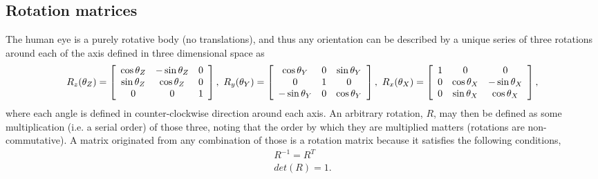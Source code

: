 \subsection{Rotation matrices}
\label{rotmatsss}
The human eye is a purely rotative body (no translations), and thus any orientation can be described by a unique series of three rotations around each of the axis defined in three dimensional space as
\begin{equation}
\label{rrr}
R _ { z } ( \theta_Z ) = \left[ \begin{array} { c c c } { \cos \theta_Z } & { - \sin \theta_Z } & { 0 } \\ { \sin \theta_Z } & { \cos \theta_Z } & { 0 } \\ { 0 } & { 0 } & { 1 } \end{array} \right], \
R _ { y } ( \theta_Y ) = \left[ \begin{array} { c c c } { \cos \theta_Y } & { 0 } & { \sin \theta_Y } \\ { 0 } & { 1 } & { 0 } \\ { - \sin \theta_Y } & { 0 } & { \cos \theta_Y } \end{array} \right], \
R _ { x } ( \theta_X ) = \left[ \begin{array} { c c c } { 1 } & { 0 } & { 0 } \\ { 0 } & { \cos \theta_X } & { - \sin \theta_X } \\ { 0 } & { \sin \theta_X } & { \cos \theta_X} \end{array} \right],
\end{equation}
where each angle is defined in counter-clockwise direction around each axis. An arbitrary rotation, $R$, may then be defined as some multiplication (i.e. a serial order) of those three, noting that the order by which they are multiplied matters (rotations are non-commutative). A matrix originated from any combination of those is a rotation matrix because it satisfies the following conditions,
\begin{align}
	\label{epwifneprnf}
	R^{-1} = R^T\\
	\label{ienvpirnf}
	det(R) = 1.
\end{align} 

